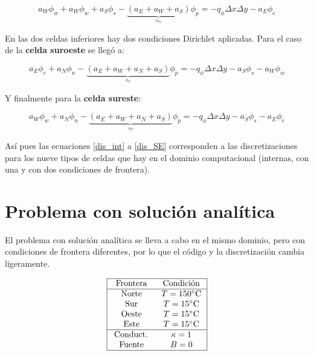 \documentclass[article,latterpaper]{article}
\begin{document}
\begin{equation}
    a_W\phi_w + a_W\phi_w + a_S\phi_s - \underbrace{(a_E+a_W+a_S)}_{\overset{a_{P1}}{}} \phi_p = -q_{\phi} \Delta x \Delta y - a_E\phi_e
    \label{dis_NE}
\end{equation}

En las dos celdas inferiores hay dos condiciones Dirichlet aplicadas. Para el caso de la \textbf{celda suroeste} se llegó a:

\begin{equation}
    a_E\phi_e + a_N\phi_n - \underbrace{(a_E+a_W+a_N+a_S)}_{\overset{a_{P}}{}} \phi_p = -q_{\phi} \Delta x \Delta y - a_S\phi_s - a_W\phi_w 
    \label{dis_SW}
\end{equation}

Y finalmente para la \textbf{celda sureste}:

\begin{equation}
    a_W\phi_w + a_N\phi_n - \underbrace{(a_E+a_W+a_N+a_S)}_{\overset{a_{P}}{}} \phi_p = -q_{\phi} \Delta x \Delta y - a_S\phi_s - a_E\phi_e 
    \label{dis_SE}
\end{equation}

Así pues las ecuaciones \eqref{dis_int} a \eqref{dis_SE} corresponden a las discretizaciones para los nueve tipos de celdas que hay en el dominio computacional (internas, con una y con dos condiciones de frontera).

\section{Problema con solución analítica}
El problema con solución analítica se lleva a cabo en el mismo dominio, pero con condiciones de frontera diferentes, por lo que el código y la discretización cambia ligeramente.

$$
\begin{array}{|cc|}
    \hline \text { Frontera } & \text { Condición } \\
    \hline \text { Norte } & T=150^{\circ} \mathrm{C} \\
    \text { Sur } & T=15^{\circ} \mathrm{C} \\
    \text { Oeste } & T=15^{\circ} \mathrm{C} \\
    \text { Este } & T=15^{\circ} \mathrm{C} \\
    \hline \text { Conduct. } & \kappa=1 \\
    \text { Fuente } & B=0 \\
    \hline
\end{array}
$$
\end{document}
